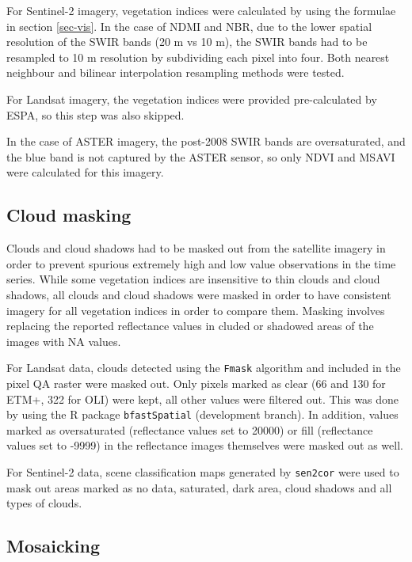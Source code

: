 \documentclass[a4paper,12pt]{scrbook}
\begin{document}
For Sentinel-2 imagery, vegetation indices were calculated by using the formulae in section \ref{sec-vis}. In the case of \ac{NDMI} and \ac{NBR}, due to the lower spatial resolution of the \ac{SWIR} bands (20 m vs 10 m), the \ac{SWIR} bands had to be resampled to 10 m resolution by subdividing each pixel into four. Both nearest neighbour and bilinear interpolation resampling methods were tested.

For Landsat imagery, the vegetation indices were provided pre-calculated by \ac{ESPA}, so this step was also skipped.

In the case of \ac{ASTER} imagery, the post-2008 \ac{SWIR} bands are oversaturated, and the blue band is not captured by the \ac{ASTER} sensor, so only \ac{NDVI} and \ac{MSAVI} were calculated for this imagery.

\subsection{Cloud masking}

Clouds and cloud shadows had to be masked out from the satellite imagery in order to prevent spurious extremely high and low value observations in the time series. While some vegetation indices are insensitive to thin clouds and cloud shadows, all clouds and cloud shadows were masked in order to have consistent imagery for all vegetation indices in order to compare them. Masking involves replacing the reported reflectance values in cluded or shadowed areas of the images with \ac{NA} values.

For Landsat data, clouds detected using the \texttt{Fmask} algorithm \citep{zhu_object-based_2012} and included in the pixel QA raster were masked out. Only pixels marked as clear (66 and 130 for \ac{ETM+}, 322 for \ac{OLI}) were kept, all other values were filtered out. This was done by using the R package \texttt{bfastSpatial} (development branch). In addition, values marked as oversaturated (reflectance values set to 20000) or fill (reflectance values set to -9999) in the reflectance images themselves were masked out as well.

For Sentinel-2 data, scene classification maps generated by \texttt{sen2cor} were used to mask out areas marked as no data, saturated, dark area, cloud shadows and all types of clouds.

\subsection{Mosaicking}
\end{document}
